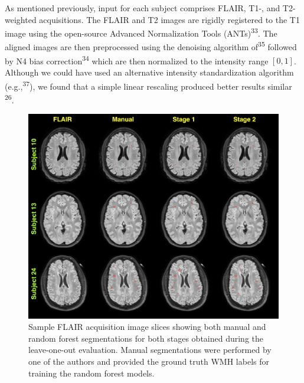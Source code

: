 \documentclass[11pt,]{article}
\begin{document}
As mentioned previously, input for each subject comprises FLAIR, T1-,
and T2-weighted acquisitions. The FLAIR and T2 images are rigidly
registered to the T1 image using the open-source Advanced Normalization
Tools (ANTs)\textsuperscript{33}. The aligned images are then
preprocessed using the denoising algorithm of\textsuperscript{35}
followed by N4 bias correction\textsuperscript{34} which are then
normalized to the intensity range \([0,1]\). Although we could have used
an alternative intensity standardization algorithm
(e.g.,\textsuperscript{37}), we found that a simple linear rescaling
produced better results similar
\textsuperscript{26}.

\begin{figure}[htbp]
\centering
\includegraphics{Figures/sampleResults.png}
\caption{Sample FLAIR acquisition image slices showing both manual and
random forest segmentations for both stages obtained during the
leave-one-out evaluation. Manual segmentations were performed by one of
the authors and provided the ground truth WMH labels for training the
random forest models.}
\end{figure}
\end{document}
